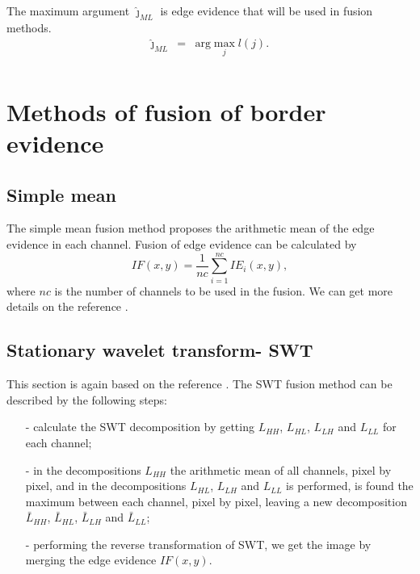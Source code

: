 \documentclass[conference]{IEEEtran}
\begin{document}
{{{{The maximum argument $\widehat{\jmath}_{ML}$ is edge evidence that will be used in fusion methods.
\begin{equation*}
\begin{array}{rcl}
	\widehat{\jmath}_{ML}&=&\text{arg}\max\limits_{j}l(j).  \\
\end{array}
\end{equation*}
\section{Methods of fusion of border evidence}\label{sec_06}
\subsection{Simple mean}
The simple mean fusion method proposes the arithmetic mean of the edge evidence in each channel. Fusion of edge evidence can be calculated by
\begin{equation}
	IF(x,y)=\frac{1}{nc}\sum_{i=1}^{nc}IE_i(x,y),
\end{equation}
where $nc$ is the number of channels to be used in the fusion. We can get more details on the reference \cite{mit}.
\subsection{Stationary wavelet transform- SWT} 
This section is again based on the reference \cite{n_r}. The SWT fusion method can be described by the following steps:
\begin{itemize}
\item[-] calculate the SWT decomposition by getting $L_{HH}$, $L_{HL}$, $L_{LH}$ and $L_{LL}$ for each channel;
\item[-] in the decompositions $L_{HH}$ the arithmetic mean of all channels, pixel by pixel, and in the decompositions $L_{HL}$, $L_{LH}$ and $L_{LL}$ is performed, is found the maximum between each channel, pixel by pixel, leaving a new decomposition $\bar{L}_{HH}$, $\bar{L}_{HL}$, $\bar{L}_{LH}$ and $\bar{L}_{LL}$;
\item[-] performing the reverse transformation of SWT, we get the image by merging the edge evidence $IF(x,y)$.  
\end{itemize}

}}}}
\end{document}
